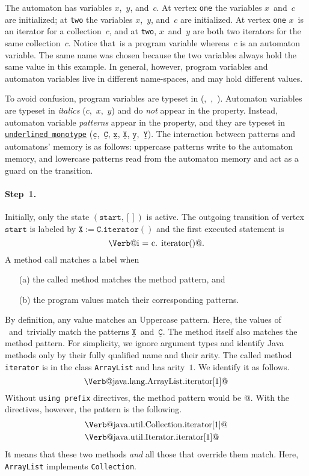 \documentclass{sigplanconf}[10pt] %
\makeatletter
\newcommand{\pattern}[1]{\ensuremath{\mathtt{\underline{#1}}}}
\newcommand{\start}{\ensuremath{\mathtt{start}}\xspace}
\newcommand{\verbline}[2][]{\[\text{\Verb@#2@}#1\]}
\makeatother
\begin{document}
The automaton has variables $x$,~$y$, and~$c$.
At vertex \texttt{one} the variables $x$~and~$c$ are initialized;
at \texttt{two} the variables $x$,~$y$, and~$c$ are initialized.
At vertex \texttt{one} $x$~is an iterator for a collection~$c$, and
at \texttt{two}, $x$~and~$y$ are both two iterators for the same collection~$c$.
Notice that~\Verb@c@ is a program variable whereas~$c$ is an automaton variable.
The same name was chosen because the two variables always hold the same value in this example.
In general, however, program variables and automaton variables live in different name-spaces, and may hold different values.

To avoid confusion, program variables are typeset in \Verb@monotype@ (\Verb@c@,~\Verb@i@,~\Verb@j@).
Automaton variables are typeset in \textit{italics} ($c$,~$x$,~$y$) and do \emph{not} appear in the property.
Instead, automaton variable \emph{patterns} appear in the property, and they are typeset in \texttt{\underline{underlined monotype}} (\pattern c,~\pattern C, \pattern x, \pattern X, \pattern y,~\pattern Y).
The interaction between patterns and automatons' memory is as follows: uppercase patterns write to the automaton memory, and lowercase patterns read from the automaton memory and act as a guard on the transition.

\paragraph{Step~1.}

Initially, only the state $(\start,[])$ is active.
The outgoing transition of vertex \start is labeled by $\pattern X:=\pattern{C}.\mathtt{iterator}()$ and the first executed statement is \verbline[.]{i = c.\PY{n+na}{iterator}()}
A method call matches a label when
\begin{itemize}
\item[(a)] the called method matches the method pattern, and
\item[(b)] the program values match their corresponding patterns.
\end{itemize}
By definition, any value matches an Uppercase pattern.
Here, the values of \Verb@i@~and~\Verb@c@ trivially match the patterns \pattern X~and~\pattern C.
The method itself also matches the method pattern.
For simplicity, we ignore argument types and identify Java methods only by their fully qualified name and their arity.
The called method \texttt{iterator} is in the class \texttt{ArrayList} and has arity~$1$.
We identify it as follows.
\verbline{java.lang.ArrayList.iterator[1]}
Without \texttt{using prefix} directives, the method pattern would be \Verb@iterator[1]@.
With the directives, however, the pattern is the following.
\begin{align*}
&\text{\Verb@java.util.Collection.iterator[1]@} \\
&\text{\Verb@java.util.Iterator.iterator[1]@}
\end{align*}
It means that these two methods \emph{and} all those that override them match.
Here, \texttt{ArrayList} implements \texttt{Collection}.
\end{document}
